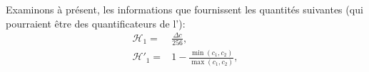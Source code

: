 \documentclass[main.tex]{subfiles}
\begin{document}
Examinons à présent, les informations que fournissent les quantités suivantes (qui pourraient être des quantificateurs de l'\hetero):
\begin{align}
\mathcal{H}_1 =& \frac{\Delta c }{256}, \\
\mathcal{H}'_1 =& 1-\frac{ \min(c_1,c_2) }{\max(c_1,c_2)}, \\
\end{align}
\end{document}
